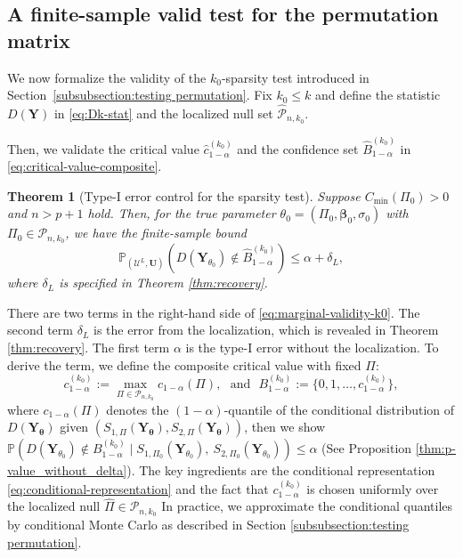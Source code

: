 \documentclass[11pt, reqno]{amsart}
\newcommand{\bP}{\mathbb{P}}
\renewcommand{\hat}{\widehat}
\renewcommand{\le}{\leqslant}
\newcommand{\mP}{\mathcal{P}}
\newcommand{\1}{\mbox{1}\hspace{-0.25em}\mbox{l}}
\theoremstyle{definition}\newtheorem{problem}{Problem}[section]
\theoremstyle{definition}\newtheorem{definition}[problem]{Definition}
\theoremstyle{remark}\newtheorem{assumption}{Assumption}
\theoremstyle{remark}\newtheorem{remark}[problem]{Remark}
\theoremstyle{definition}\newtheorem{example}[problem]{Example}
\theoremstyle{plain}\newtheorem{theorem}[problem]{Theorem}
\theoremstyle{plain}\newtheorem{question}[problem]{Question}
\theoremstyle{plain}\newtheorem{lemma}[problem]{Lemma}
\theoremstyle{plain}\newtheorem{proposition}[problem]{Proposition}
\theoremstyle{plain}\newtheorem{corollary}[problem]{Corollary}
\theoremstyle{plain}\newtheorem{conjecture}[problem]{Conjecture}
\begin{document}
\subsection{A finite-sample valid test for the permutation matrix}
We now formalize the validity of the $k_0$-sparsity test introduced in Section~\ref{subsubsection:testing permutation}.
Fix $k_0\le k$ and define the statistic $D(\bm Y)$ in \eqref{eq:Dk-stat} and the localized null set $\hat{\mP}_{n,k_0}$.

Then, we validate the critical value $\hat{c}_{1-\alpha}^{(k_0)}$ and the confidence set $\hat{B}_{1-\alpha}^{(k_0)}$ in \eqref{eq:critical-value-composite}.



\begin{theorem}[Type-I error control for the sparsity test] \label{thm:p-value}
Suppose $C_{\min}(\Pi_0) > 0$ and $n > p + 1$ hold.
Then, for the true parameter $\theta_0=(\Pi_0,\bm\beta_0,\sigma_0)$ with $\Pi_0\in\mP_{n,k_0}$, we have the finite-sample bound
\begin{equation}\label{eq:marginal-validity-k0}
    \bP_{\left(\mathcal{U}^L, \bm{U}\right)}\left(D(\bm Y_{\theta_0})\notin \hat{B}^{(k_0)}_{1-\alpha}\right)\le \alpha+\delta_L,
\end{equation}
where $\delta_L$ is specified in Theorem \ref{thm:recovery}.
\end{theorem}

There are two terms in the right-hand side of \eqref{eq:marginal-validity-k0}.
The second term $\delta_L$ is the error from the localization, which is revealed in Theorem \ref{thm:recovery}.
The first term $\alpha$ is the type-I error without the localization. 
To derive the term, we define the composite critical value with fixed $\Pi$:
\begin{equation}\label{eq:c-composite-theory}
    c_{1-\alpha}^{(k_0)}:=\max_{\Pi\in {\mP}_{n,k_0}}c_{1-\alpha}(\Pi), \mbox{~~and~~}
    B^{(k_0)}_{1-\alpha}:=\{0,1,\ldots,c_{1-\alpha}^{(k_0)}\},
\end{equation}
where $c_{1-\alpha}(\Pi)$ denotes the $(1-\alpha)$-quantile of the conditional distribution of $D(\bm Y_{\bm \theta})$ given $(S_{1,\Pi}(\bm Y_{\bm \theta}),S_{2,\Pi}(\bm Y_{\bm \theta}))$, then we show $\bP(D(\bm Y_{\theta_0})\notin B^{(k_0)}_{1-\alpha}\mid S_{1,\Pi_0}(\bm Y_{\theta_0}),\ S_{2,\Pi_0}(\bm Y_{\theta_0}))\le \alpha$ (See Proposition \ref{thm:p-value_without_delta}).
The key ingredients are the conditional representation \eqref{eq:conditional-representation} and the fact that $c_{1-\alpha}^{(k_0)}$ is chosen uniformly over the localized null $\hat \Pi\in {\mP}_{n,k_0}$ 
In practice, we approximate the conditional quantiles by conditional Monte Carlo as described in Section \ref{subsubsection:testing permutation}.
\end{document}
